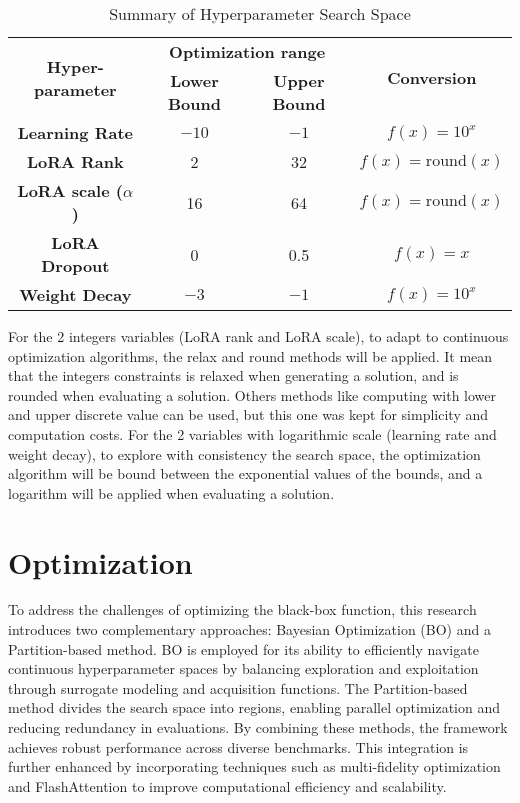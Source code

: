 \begin{table}[h!]
    \centering
    \begin{tabular}{|c|c|c|c|}
        \hline
        \multirow{2}{*}{\textbf{Hyper-parameter}} & \multicolumn{2}{|c|}{\textbf{Optimization range}} & \multirow{2}{*}{\textbf{Conversion}} \\
        \cline{2-3}
         & \textbf{Lower Bound} & \textbf{Upper Bound} &  \\
        \hline
        \textbf{Learning Rate} & $-10$ & $-1$ & $f(x) = 10^{x}$ \\
        \hline
        \textbf{LoRA Rank} & 2 & 32 & $f(x) = \text{round}(x)$ \\
        \hline
        \textbf{LoRA scale ($\alpha$)} & 16 & 64 & $f(x) = \text{round}(x)$ \\
        \hline
        \textbf{LoRA Dropout} & 0 & 0.5 & $f(x) = x$ \\
        \hline
        \textbf{Weight Decay} & $-3$ & $-1$ & $f(x) = 10^{x}$  \\
        \hline
    \end{tabular}
    \caption{Summary of Hyperparameter Search Space}
    \label{tab:hyperparam_table}
\end{table}

For the 2 integers variables (LoRA rank and LoRA scale), to adapt to continuous optimization algorithms, the relax and round methods will be applied. It mean that the integers constraints is relaxed when generating a solution, and is rounded when evaluating a solution. Others methods like computing with lower and upper discrete value can be used, but this one was kept for simplicity and computation costs.
For the 2 variables with logarithmic scale (learning rate and weight decay), to explore with consistency the search space, the optimization algorithm will be bound between the exponential values of the bounds, and a logarithm will be applied when evaluating a solution.

\section{Optimization}
\label{sec:opt}
To address the challenges of optimizing the black-box function, this research introduces two complementary approaches: Bayesian Optimization (BO) and a Partition-based method. BO is employed for its ability to efficiently navigate continuous hyperparameter spaces by balancing exploration and exploitation through surrogate modeling and acquisition functions. The Partition-based method divides the search space into regions, enabling parallel optimization and reducing redundancy in evaluations. By combining these methods, the framework achieves robust performance across diverse benchmarks. This integration is further enhanced by incorporating techniques such as multi-fidelity optimization and FlashAttention to improve computational efficiency and scalability.


